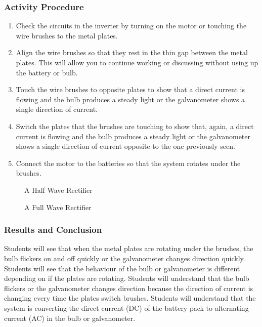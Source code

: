 \subsubsection*{Activity Procedure}
\begin{enumerate}
\item{Check the circuits in the inverter by turning on the motor or touching the wire brushes to the metal plates.} 
\item{Align the wire brushes so that they rest in the thin gap between the metal plates. This will allow you to continue working or discussing without using up the battery or bulb.} 
\item{Touch the wire brushes to opposite plates to show that a direct current is flowing and the bulb produces a steady light or the galvanometer shows a single direction of current.} 
\item{Switch the plates that the brushes are touching to show that, again, a direct current is flowing and the bulb produces a steady light or the galvanometer shows a single direction of current opposite to the one previously seen.} 
\item{Connect the motor to the batteries so that the system rotates under the brushes.} 
\end{enumerate}

\begin{figure}
\begin{center}
\def\svgwidth{150pt}

\caption{A Half Wave Rectifier}
\label{fig:half-wave-rectifier}
\end{center}
\end{figure}

\begin{figure}
\begin{center}
\def\svgwidth{250pt}

\caption{A Full Wave Rectifier}
\label{fig:full-wave-rectifier}
\end{center}
\end{figure}

\subsubsection*{Results and Conclusion}
Students will see that when the metal plates are rotating under the brushes, the bulb flickers on and off quickly or the galvanometer changes direction quickly.  
Students will see that the behaviour of the bulb or galvanometer is different depending on if the plates are rotating.  
Students will understand that the bulb flickers or the galvanometer changes direction because the direction of current is changing every time the plates switch brushes.  
Students will understand that the system is converting the direct current (DC) of the battery pack to alternating current (AC) in the bulb or galvanometer.  

